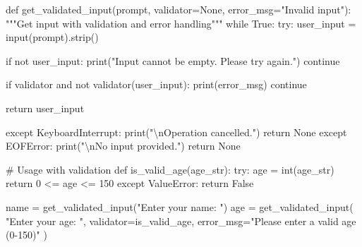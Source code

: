 \documentclass[
  letterpaper,
  DIV=11,
  numbers=noendperiod,
  oneside]{scrreprt}
\newenvironment{Shaded}{}{}
\newcommand{\BuiltInTok}[1]{\textcolor[rgb]{0.84,0.23,0.29}{#1}}
\newcommand{\CharTok}[1]{\textcolor[rgb]{0.01,0.18,0.38}{#1}}
\newcommand{\CommentTok}[1]{\textcolor[rgb]{0.42,0.45,0.49}{#1}}
\newcommand{\ControlFlowTok}[1]{\textcolor[rgb]{0.84,0.23,0.29}{#1}}
\newcommand{\DecValTok}[1]{\textcolor[rgb]{0.00,0.36,0.77}{#1}}
\newcommand{\KeywordTok}[1]{\textcolor[rgb]{0.84,0.23,0.29}{#1}}
\newcommand{\NormalTok}[1]{\textcolor[rgb]{0.14,0.16,0.18}{#1}}
\newcommand{\OperatorTok}[1]{\textcolor[rgb]{0.14,0.16,0.18}{#1}}
\newcommand{\PreprocessorTok}[1]{\textcolor[rgb]{0.84,0.23,0.29}{#1}}
\newcommand{\StringTok}[1]{\textcolor[rgb]{0.01,0.18,0.38}{#1}}
\newcommand{\VariableTok}[1]{\textcolor[rgb]{0.89,0.38,0.04}{#1}}
\begin{document}
\begin{Shaded}
\begin{Highlighting}[]
\KeywordTok{def}\NormalTok{ get\_validated\_input(prompt, validator}\OperatorTok{=}\VariableTok{None}\NormalTok{, error\_msg}\OperatorTok{=}\StringTok{"Invalid input"}\NormalTok{):}
    \CommentTok{"""Get input with validation and error handling"""}
    \ControlFlowTok{while} \VariableTok{True}\NormalTok{:}
        \ControlFlowTok{try}\NormalTok{:}
\NormalTok{            user\_input }\OperatorTok{=} \BuiltInTok{input}\NormalTok{(prompt).strip()}
            
            \ControlFlowTok{if} \KeywordTok{not}\NormalTok{ user\_input:}
                \BuiltInTok{print}\NormalTok{(}\StringTok{"Input cannot be empty. Please try again."}\NormalTok{)}
                \ControlFlowTok{continue}
                
            \ControlFlowTok{if}\NormalTok{ validator }\KeywordTok{and} \KeywordTok{not}\NormalTok{ validator(user\_input):}
                \BuiltInTok{print}\NormalTok{(error\_msg)}
                \ControlFlowTok{continue}
                
            \ControlFlowTok{return}\NormalTok{ user\_input}
            
        \ControlFlowTok{except} \PreprocessorTok{KeyboardInterrupt}\NormalTok{:}
            \BuiltInTok{print}\NormalTok{(}\StringTok{"}\CharTok{\textbackslash{}n}\StringTok{Operation cancelled."}\NormalTok{)}
            \ControlFlowTok{return} \VariableTok{None}
        \ControlFlowTok{except} \PreprocessorTok{EOFError}\NormalTok{:}
            \BuiltInTok{print}\NormalTok{(}\StringTok{"}\CharTok{\textbackslash{}n}\StringTok{No input provided."}\NormalTok{)}
            \ControlFlowTok{return} \VariableTok{None}

\CommentTok{\# Usage with validation}
\KeywordTok{def}\NormalTok{ is\_valid\_age(age\_str):}
    \ControlFlowTok{try}\NormalTok{:}
\NormalTok{        age }\OperatorTok{=} \BuiltInTok{int}\NormalTok{(age\_str)}
        \ControlFlowTok{return} \DecValTok{0} \OperatorTok{\textless{}=}\NormalTok{ age }\OperatorTok{\textless{}=} \DecValTok{150}
    \ControlFlowTok{except} \PreprocessorTok{ValueError}\NormalTok{:}
        \ControlFlowTok{return} \VariableTok{False}

\NormalTok{name }\OperatorTok{=}\NormalTok{ get\_validated\_input(}\StringTok{"Enter your name: "}\NormalTok{)}
\NormalTok{age }\OperatorTok{=}\NormalTok{ get\_validated\_input(}
    \StringTok{"Enter your age: "}\NormalTok{, }
\NormalTok{    validator}\OperatorTok{=}\NormalTok{is\_valid\_age,}
\NormalTok{    error\_msg}\OperatorTok{=}\StringTok{"Please enter a valid age (0{-}150)"}
\NormalTok{)}
\end{Highlighting}
\end{Shaded}
\end{document}
